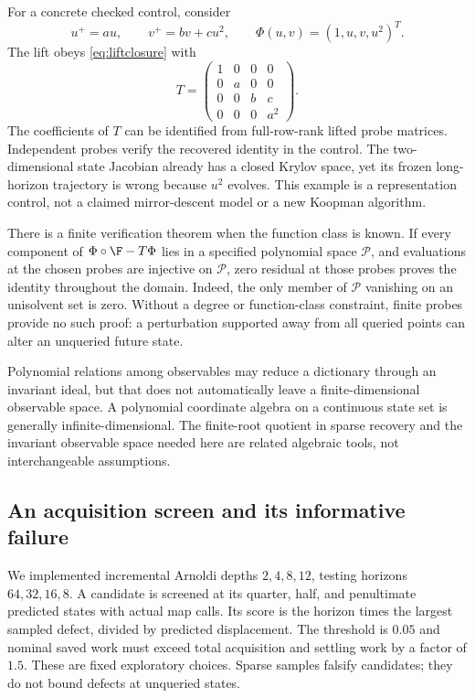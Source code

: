 For a concrete checked control, consider
\[
 u^+=a u,\qquad v^+=b v+c u^2,\qquad
 \Phi(u,v)=(1,u,v,u^2)^T.
\]
The lift obeys \eqref{eq:liftclosure} with
\[
 T=\begin{pmatrix}
 1&0&0&0\\0&a&0&0\\0&0&b&c\\0&0&0&a^2
 \end{pmatrix}.
\]
The coefficients of $T$ can be identified from full-row-rank lifted probe
matrices. Independent probes verify the recovered identity in the control.
The two-dimensional state Jacobian already has a closed Krylov space, yet
its frozen long-horizon trajectory is wrong because $u^2$ evolves. This
example is a representation control, not a claimed mirror-descent model
or a new Koopman algorithm.

There is a finite verification theorem when the function class is known.
If every component of $\Phi\circ\F-T\Phi$ lies in a specified polynomial
space $\mathcal P$, and evaluations at the chosen probes are injective on
$\mathcal P$, zero residual at those probes proves the identity throughout
the domain. Indeed, the only member of $\mathcal P$ vanishing on an
unisolvent set is zero. Without a degree or function-class constraint,
finite probes provide no such proof: a perturbation supported away from
all queried points can alter an unqueried future state.

Polynomial relations among observables may reduce a dictionary through an
invariant ideal, but that does not automatically leave a finite-dimensional
observable space. A polynomial coordinate algebra on a continuous state
set is generally infinite-dimensional. The finite-root quotient in sparse
recovery and the invariant observable space needed here are related
algebraic tools, not interchangeable assumptions.

\subsection{An acquisition screen and its informative failure}
We implemented incremental Arnoldi depths $2,4,8,12$, testing horizons
$64,32,16,8$. A candidate is screened at its quarter, half, and penultimate
predicted states with actual map calls. Its score is the horizon times the
largest sampled defect, divided by predicted displacement. The threshold
is $0.05$ and nominal saved work must exceed total acquisition and settling
work by a factor of $1.5$. These are fixed exploratory choices. Sparse
samples falsify candidates; they do not bound defects at unqueried states.

